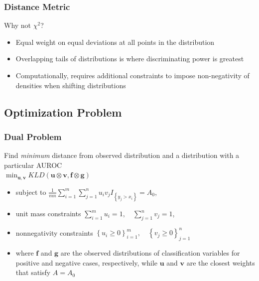 \documentclass{beamer}
\begin{document}

\begin{frame}
\frametitle{Distance Metric}

Why not $\chi^2$?
\begin{itemize}
    \item Equal weight on equal deviations at all points in the distribution
    \item Overlapping tails of distributions is where discriminating power is greatest
    \item Computationally, requires additional constraints to impose non-negativity of densities when shifting distributions
\end{itemize}

\end{frame}



\subsection{Optimization Problem}



\begin{frame}
\frametitle{Dual Problem}

Find \emph{minimum} distance from observed distribution and a distribution with a particular AUROC \\
$\min_{\mathbf{u}, \mathbf{v}}
        KLD(\mathbf{u} \otimes \mathbf{v}, \mathbf{f} \otimes \mathbf{g})$
\begin{itemize}
    \item subject to 
    $\frac{1}{m n} \sum_{i = 1}^{m} \sum_{j = 1}^{n} u_i v_j I_{\left\{ y_j > x_i \right\}} = A_0$,
    \item unit mass constraints 
    $\sum_{i = 1}^{m} u_i = 1, \quad \sum_{j = 1}^{n} v_j = 1$,
    \item nonnegativity constraints 
    $ \left\{ u_i  \geq 0 \right\}_{i=1}^{m}, \quad \left\{ v_j \geq 0 \right\}_{j=1}^{n}$
    \item where $\mathbf{f}$ and $\mathbf{g}$ are the observed distributions of classification variables for positive and negative cases, respectively, 
    while $\mathbf{u}$ and $\mathbf{v}$ are the closest weights that satisfy $A = A_0$
\end{itemize}

\end{frame}
\end{document}
